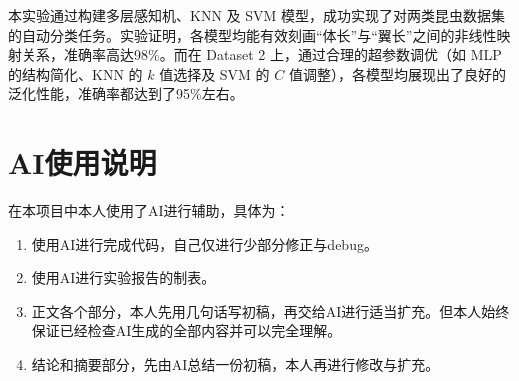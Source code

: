 本实验通过构建多层感知机、KNN 及 SVM 模型，成功实现了对两类昆虫数据集的自动分类任务。实验证明，各模型均能有效刻画“体长”与“翼长”之间的非线性映射关系，准确率高达98\%。而在 Dataset 2 上，通过合理的超参数调优（如 MLP 的结构简化、KNN 的 $k$ 值选择及 SVM 的 $C$ 值调整），各模型均展现出了良好的泛化性能，准确率都达到了95\%左右。


\appendix

\section*{AI使用说明}
在本项目中本人使用了AI进行辅助，具体为：
\begin{enumerate}
\item 使用AI进行完成代码，自己仅进行少部分修正与debug。
\item 使用AI进行实验报告的制表。
\item 正文各个部分，本人先用几句话写初稿，再交给AI进行适当扩充。但本人始终保证已经检查AI生成的全部内容并可以完全理解。
\item 结论和摘要部分，先由AI总结一份初稿，本人再进行修改与扩充。
\end{enumerate}




